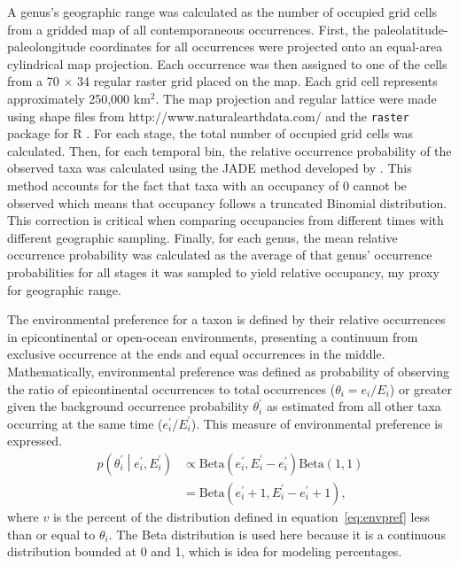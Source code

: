 \documentclass[11pt]{article}
\begin{document}
A genus's geographic range was calculated as the number of occupied grid cells from a gridded map of all contemporaneous occurrences. First, the paleolatitude-paleolongitude coordinates for all occurrences were projected onto an equal-area cylindrical map projection. Each occurrence was then assigned to one of the cells from a 70 \(\times\) 34 regular raster grid placed on the map. Each grid cell represents approximately 250,000 km\(^{2}\). The map projection and regular lattice were made using shape files from http://www.naturalearthdata.com/ and the \texttt{raster} package for R \citep{raster}. For each stage, the total number of occupied grid cells was calculated. Then, for each temporal bin, the relative occurrence probability of the observed taxa was calculated using the \uppercase{jade} method developed by \citet{Chao2015a}. This method accounts for the fact that taxa with an occupancy of 0 cannot be observed which means that occupancy follows a truncated Binomial distribution. This correction is critical when comparing occupancies from different times with different geographic sampling. Finally, for each genus, the mean relative occurrence probability was calculated as the average of that genus' occurrence probabilities for all stages it was sampled to yield relative occupancy, my proxy for geographic range.

The environmental preference for a taxon is defined by their relative occurrences in epicontinental or open-ocean environments, presenting a continuum from exclusive occurrence at the ends and equal occurrences in the middle. Mathematically, environmental preference was defined as probability of observing the ratio of epicontinental occurrences to total occurrences (\(\theta_{i} = e_{i} / E_{i}\)) or greater given the background occurrence probability \(\theta^{\prime}_{i}\) as estimated from all other taxa occurring at the same time (\(e^{\prime}_{i} / E^{\prime}_{i}\)). This measure of environmental preference is expressed.
\begin{equation}
  \begin{aligned}
    p\left(\theta^{\prime}_{i} \middle| e^{\prime}_{i}, E^{\prime}_{i} \right) &\propto \mathrm{Beta}(e^{\prime}_{i}, E^{\prime}_{i} - e^{\prime}_{i}) \mathrm{Beta}(1, 1) \\
    &= \mathrm{Beta}(e^{\prime}_{i} + 1, E^{\prime}_{i} - e^{\prime}_{i} + 1),
  \end{aligned}
  \label{eq:envpref}
\end{equation}
where \(v\) is the percent of the distribution defined in equation~\ref{eq:envpref} less than or equal to \(\theta_{i}\). The Beta distribution is used here because it is a continuous distribution bounded at 0 and 1, which is idea for modeling percentages.
\end{document}
